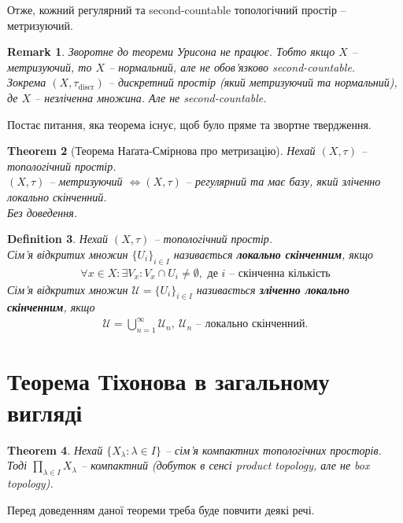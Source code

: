 \documentclass[a4paper, 10pt]{article}
\theoremstyle{theoremdd}
\newtheorem{theorem}{Theorem}[subsection]
\newtheorem{definition}[theorem]{Definition}
\newtheorem{remark}[theorem]{Remark}
\begin{document}
\noindent
Отже, кожний регулярний та second-countable топологічний простір -- метризуючий.

\begin{remark}
Зворотне до теореми Урисона не працює. Тобто якщо $X$ -- метризуючий, то $X$ -- нормальний, але не обов'язково second-countable.\\
Зокрема $(X,\tau_{\text{discr}})$ --  дискретний простір (який метризуючий та нормальний), де $X$ -- незліченна множина. Але не second-countable.
\end{remark}
\noindent
Постає питання, яка теорема існує, щоб було пряме та звортне твердження.
\begin{theorem}[Теорема Наґата-Смірнова про метризацію]
Нехай $(X,\tau)$ -- топологічний простір.\\
$(X,\tau)$ -- метризуючий $\iff (X,\tau)$ -- регулярний та має базу, який зліченно локально скінченний.\\
\textit{Без доведення.}
\end{theorem}

\begin{definition}
Нехай $(X,\tau)$ -- топологічний простір. \\
Сім'я відкритих множин $\{U_i\}_{i \in I}$ називається \textbf{локально скінченним}, якщо
\begin{align*}
\forall x \in X: \exists V_x: V_x \cap U_i \neq \emptyset, \text{ де $i$ -- скінченна кількість}
\end{align*}
Сім'я відкритих множин $\mathcal{U} = \{U_i\}_{i \in I}$ називається \textbf{зліченно локально скінченним}, якщо
\begin{align*}
\mathcal{U} = \bigcup_{n=1}^\infty \mathcal{U}_n,\ \mathcal{U}_n \text{ -- локально скінченний.}
\end{align*}
\end{definition}
\newpage

\section{Теорема Тіхонова в загальному вигляді}
\begin{theorem}
Нехай $\{X_\lambda : \lambda \in I \}$ -- сім'я компактних топологічних просторів. Тоді $\displaystyle\prod_{\lambda \in I} X_\lambda$ -- компактний (добуток в сенсі product topology, але не box topology).
\end{theorem}
\noindent
Перед доведенням даної теореми треба буде повчити деякі речі.
\end{document}
